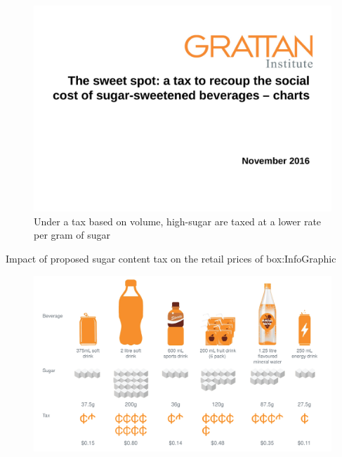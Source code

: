 \documentclass[embargoed]{grattan}
\begin{document}
\begin{figure}
\caption{Under a tax based on \SSB{} volume, high-sugar \SSBs{} are taxed at a lower rate per gram of sugar}\label{fig:under-tax-based-on-SSB-volume-high-sugar-SSBs-taxed-lower}

\includegraphics[page=12]{atlas/ObesityCharts}


\end{figure}

\begin{bigbox*}{Impact of proposed sugar content tax on the retail prices of \SSBs{}}{box:InfoGraphic}
\begin{figure}[H]

\hspace{2.5cm}\includegraphics[width=.8\textwidth]{atlas/InfoGraphicTransparent}

\end{figure}
\end{bigbox*}
\end{document}
